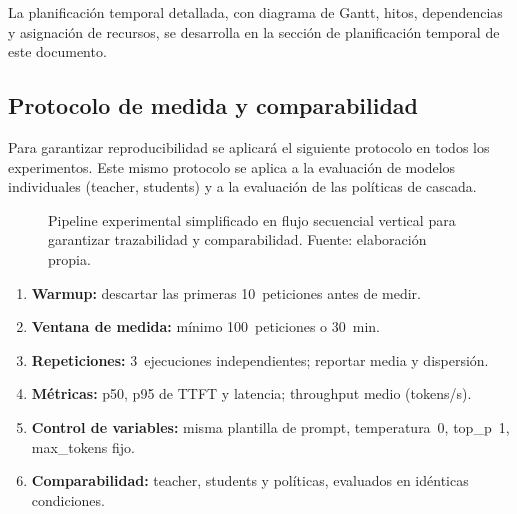 \documentclass[11pt,a4paper]{article}
\begin{document}
La planificación temporal detallada, con diagrama de Gantt, hitos, dependencias y asignación de recursos, se desarrolla en la sección de planificación temporal de este documento.

\subsection{Protocolo de medida y comparabilidad}

Para garantizar reproducibilidad se aplicará el siguiente protocolo en todos los experimentos. Este mismo protocolo se aplica a la evaluación de modelos individuales (teacher, students) y a la evaluación de las políticas de cascada.

\begin{figure}[H]
\centering
{}
\caption{Pipeline experimental simplificado en flujo secuencial vertical para garantizar trazabilidad y comparabilidad. Fuente: elaboración propia.}
\label{fig:pipeline-experimental}
\end{figure}

\begin{enumerate}[nosep,leftmargin=*]
\item \textbf{Warmup:} descartar las primeras 10~peticiones antes de medir.
\item \textbf{Ventana de medida:} mínimo 100~peticiones o 30~min.
\item \textbf{Repeticiones:} 3~ejecuciones independientes; reportar media y dispersión.
\item \textbf{Métricas:} p50, p95 de TTFT y latencia; throughput medio (tokens/s).
\item \textbf{Control de variables:} misma plantilla de prompt, temperatura~0, top\_p~1, max\_tokens fijo.
\item \textbf{Comparabilidad:} teacher, students y políticas, evaluados en idénticas condiciones.
\end{enumerate}
\end{document}
